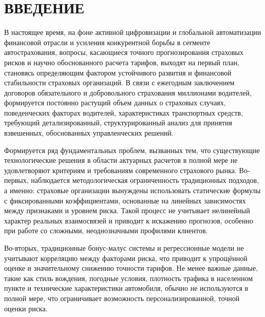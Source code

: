 %   

\section*{ВВЕДЕНИЕ}
В настоящее время, на фоне активной цифровизации и глобальной автоматизации финансовой отрасли и усиления конкурентной борьбы в сегменте автострахования, вопросы, касающиеся точного прогнозирования страховых рисков и научно обоснованного расчета тарифов, выходят на первый план, становясь определяющим фактором устойчивого развития и финансовой стабильности страховых организаций. В связи с ежегодным заключением договоров обязательного и добровольного страхования миллионами водителей, формируется постоянно растущий объем данных о страховых случаях, поведенческих факторах водителей, характеристиках транспортных средств, требующий детализированный, структурированный анализ для принятия взвешенных, обоснованных управленческих решений. 

Формируется ряд фундаментальных проблем, вызванных тем, что существующие технологические решения в области актуарных расчетов в полной мере не удовлетворяют критериям и требованиям современного страхового рынка. Во-первых, наблюдается методологическая ограниченность традиционных подходов, а именно: страховые организации вынуждены использовать статические формулы с фиксированными коэффициентами, основанные на линейных зависимостях между признаками и уровнем риска. Такой процесс не учитывает нелинейный характер реальных взаимосвязей и приводит к искажению прогнозов, особенно при работе со сложными, неоднозначными профилями клиентов. 

Во-вторых, традиционные бонус-малус системы и регрессионные модели не учитывают корреляцию между факторами риска, что приводит к упрощённой оценке и значительному снижению точности тарифов. Не менее важные данные, такие как стиль вождения, погодные условия, плотность трафика в населенном пункте и технические характеристики автомобиля, обычно не используются в полной мере, что ограничивает возможность персонализированной, точной оценки риска.

